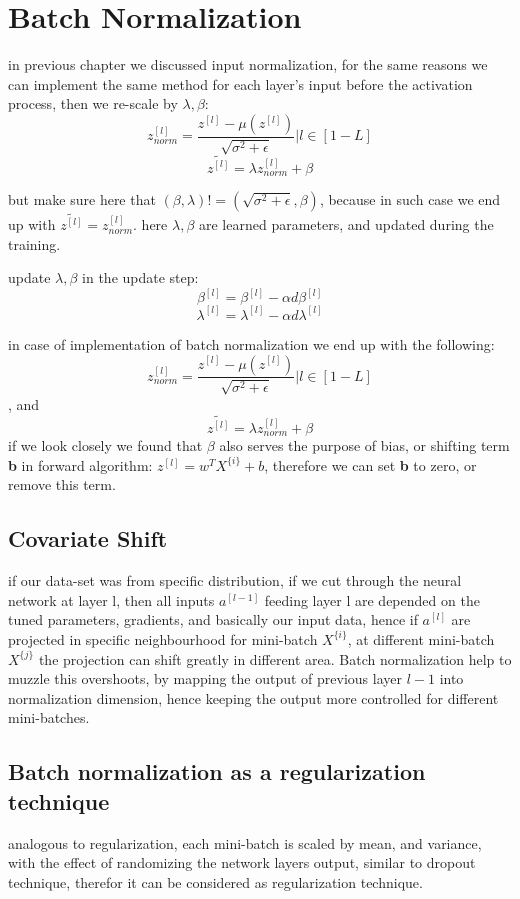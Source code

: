 \documentclass[4apaper,12pt]{book}
\begin{document}
  \section{Batch Normalization}
  \begin{description}
\item in previous chapter we discussed input normalization, for the same reasons we can implement the same method for each layer's input before the activation process, then we re-scale by $\lambda,\beta$: $$
  z_{norm}^{[l]} = \frac{z^{[l]} - \mu({z^{[l]}})}{\sqrt{\sigma^2+\epsilon}} | l \in [1-L] $$
  $$\widetilde{z^{[l]}}  = \lambda z_{norm}^{[l]}  + \beta $$
\item but make sure here that $(\beta,\lambda)!=(\sqrt{\sigma^2+\epsilon}, \beta)$, because in such case we end up with  $\widetilde{z^{[l]}} = z_{norm}^{[l]}$. here $\lambda, \beta$ are learned parameters, and updated during the training.
\item update $\lambda, \beta$ in the update step:
  $$ \beta^{[l]} = \beta^{[l]} -\alpha d\beta^{[l]} $$
  $$ \lambda^{[l]} = \lambda^{[l]} -\alpha d\lambda^{[l]} $$
\item in case of implementation of batch normalization we end up with the following: $$ z_{norm}^{[l]} = \frac{z^{[l]} - \mu({z^{[l]}})}{\sqrt{\sigma^2+\epsilon}} | l \in [1-L] $$, and  $$\widetilde{z^{[l]}}  = \lambda z_{norm}^{[l]}  + \beta $$ if we look closely we found that $\beta$ also serves the purpose of bias, or shifting term \textbf{b} in forward algorithm: $z^{[l]} = w^TX^{\{i\}} + b$, therefore we can set \textbf{b} to zero, or remove this term.
  \subsection{Covariate Shift}
\item if our data-set was from specific distribution, if we cut through the neural network at layer l, then all inputs $a^{[l-1]}$ feeding layer l are depended on the tuned parameters, gradients, and basically our input data, hence if $a^{[l]}$ are projected in specific neighbourhood  for mini-batch $X^{\{i\}}$, at different mini-batch $X^{\{j\}}$ the projection can shift greatly in different area. Batch normalization help to muzzle this overshoots, by mapping the output of previous layer $l-1$ into normalization dimension, hence keeping the output more controlled for different mini-batches.
  \subsection{Batch normalization as a regularization technique}
\item analogous to regularization, each mini-batch is scaled by mean, and variance, with the effect of randomizing the network layers output, similar to dropout technique, therefor it can be considered as regularization technique.

\end{description}
\end{document}
